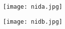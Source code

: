 \documentclass{article}
\begin{document}
\begin{center}
\vfill
\begin{figure}[H]
\centering
\texttt{[image: nida.jpg]}
\end{figure}

\begin{figure}[H]
\centering
\texttt{[image: nidb.jpg]}
\end{figure}

\end{center}
\vfill
\end{document}
